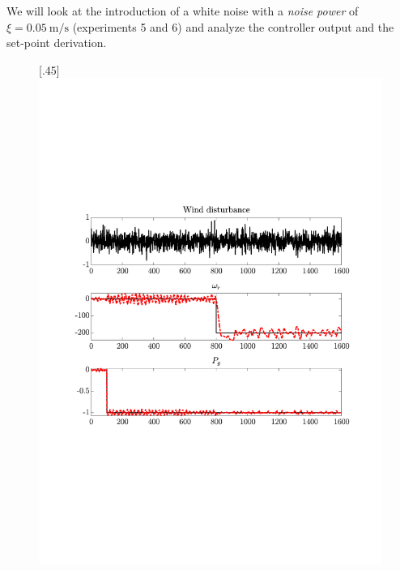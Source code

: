 We will look at the introduction of a white noise with a \textit{noise power} of $\xi= \SI{0.05}{\metre\per\second}$ (experiments 5 and 6) and analyze the controller output and the set-point derivation.

\begin{figure}[H]
    \centering

    [.45\textwidth]{\includegraphics[width=1\linewidth, scale=1, trim=60 230 55 150,clip]{fig/Open_loop/exp_5_ref.pdf}}
%

\end{figure}
